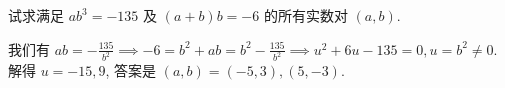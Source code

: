 \begin{prob}
\label{prob:prob-14}
试求满足 $ab^3 = -135$ 及 $(a+b)b = -6$ 的所有实数对 $(a,b)$.
\end{prob}

\begin{soln}
我们有 $ab = -\frac{135}{b^2} \implies -6 = b^2 + ab =
b^2 - \frac{135}{b^2} \implies u^2 + 6u - 135 = 0, u = b^2 \ne 0$.
解得 $u = -15, 9$, 答案是 $\boxed{(a,b) = (-5,3), (5,-3).}$
\end{soln}
